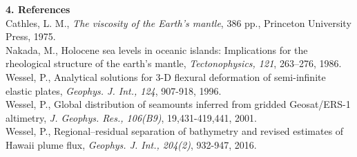 \documentclass[12pt]{article}
\begin{document}
\noindent

{\center \bf 4. References}\\

\noindent
Cathles, L. M., {\it The viscosity of the Earth's mantle}, 386 pp., Princeton University Press, 1975. \\
Nakada, M., Holocene sea levels in oceanic islands: Implications for the rheological structure of the earth's mantle, {\it Tectonophysics, 121}, 263--276, 1986.\\
Wessel, P., Analytical solutions for 3-D flexural deformation of semi-infinite elastic plates, {\it Geophys. J. Int., 124}, 907-918, 1996.\\
Wessel, P., Global distribution of seamounts inferred from gridded Geosat/ERS-1 altimetry, {\it J. Geophys. Res., 106(B9)}, 19,431-419,441, 2001.\\
Wessel, P., Regional–residual separation of bathymetry and revised estimates of Hawaii plume flux, {\it Geophys. J. Int., 204(2)}, 932-947, 2016.
\end{document}
